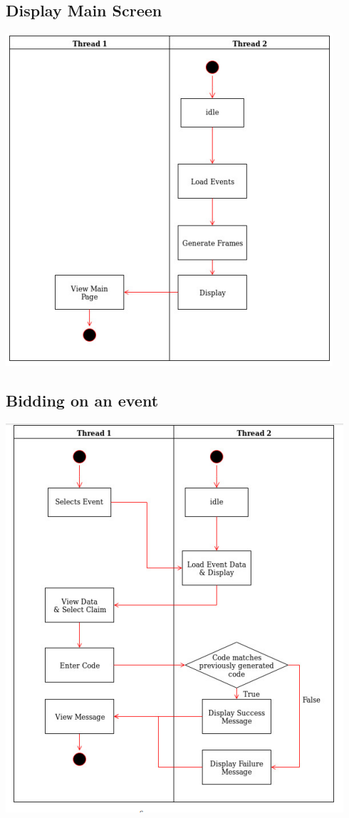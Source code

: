 \documentclass[11pt]{article}
\begin{document}
	\subsection{Display Main Screen}
	\includegraphics[scale=1]{Display.png}
	\subsection{Bidding on an event}
	\includegraphics[scale=1]{Bid.png}
\end{document}
